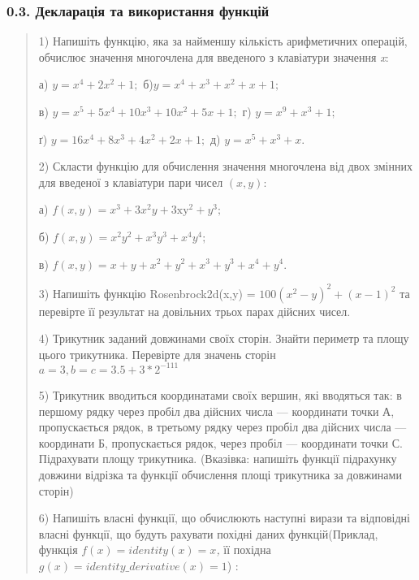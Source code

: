 \documentclass[]{article}
\begin{document}
\subsubsection{0.3. Декларація та використання
функцій}\label{ux434ux435ux43aux43bux430ux440ux430ux446ux456ux44f-ux442ux430-ux432ux438ux43aux43eux440ux438ux441ux442ux430ux43dux43dux44f-ux444ux443ux43dux43aux446ux456ux439}

\begin{quote}
1) Напишіть функцію, яка за найменшу кількість арифметичних операцій,
обчислює значення многочлена для введеного з клавіатури значення
\emph{x}:

а) \(y = x^{4} + 2x^{2} + 1;\) б)\(y = x^{4} + x^{3} + x^{2} + x + 1;\)

в)
\(y = x^{5} + 5x^{4} + \mathrm{10}x^{3} + \mathrm{10}x^{2} + 5x + 1;\)
г) \(y = x^{9} + x^{3} + 1;\)

ґ) \(y = \mathrm{16}x^{4} + 8x^{3} + 4x^{2} + 2x + 1;\) д)
\(y = x^{5} + x^{3} + x\mathrm{.}\)

2) Скласти функцію для обчислення значення многочлена від двох змінних
для введеної з клавіатури пари чисел \((x,y)\):

а)
\(f\left( x,y \right) = x^{3} + 3x^{2}y + 3\mathrm{\text{xy}}^{2} + y^{3};\)

б) \(f\left( x,y \right) = x^{2}y^{2} + x^{3}y^{3} + x^{4}y^{4};\)

в)
\(f\left( x,y \right) = x + y + x^{2} + y^{2} + x^{3} + y^{3} + x^{4} + y^{4}\mathrm{.}\)

3) Напишіть функцію Rosenbrock2d(x,y) =
\(100(x^{2} - y)^{2} + (x - 1)^{2}\) та перевірте її результат на
довільних трьох парах дійсних чисел.

4) Трикутник заданий довжинами своїх сторін. Знайти периметр та площу
цього трикутника. Перевірте для значень сторін
\(a = 3,b = c = 3.5 + 3*2^{- 111}\)

5) Трикутник вводиться координатами своїх вершин, які вводяться так: в
першому рядку через пробіл два дійсних числа --- координати точки А,
пропускається рядок, в третьому рядку через пробіл два дійсних числа ---
координати Б, пропускається рядок, через пробіл --- координати точки С.
Підрахувати площу трикутника. (Вказівка: напишіть функції підрахунку
довжини відрізка та функції обчислення площі трикутника за довжинами
сторін)

6) Напишіть власні функції, що обчислюють наступні вирази та відповідні
власні функції, що будуть рахувати похідні даних функцій(Приклад,
функція \(f\left( x \right) = identity\left( x \right) = x\)\emph{,} її
похідна
\(g\left( x \right) = identity\_ derivative\left( x \right) = 1\)) :


\end{quote}
\end{document}
